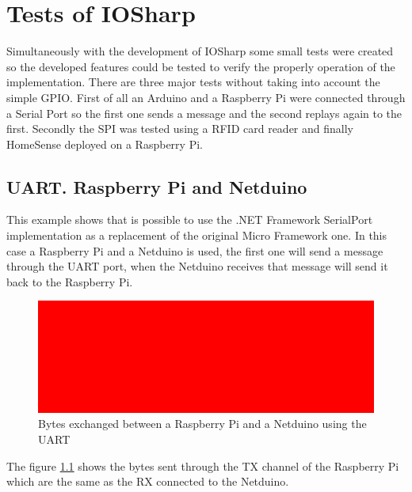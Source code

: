 \chapter{Tests of IOSharp}\label{C:IOSharp Implementation}
Simultaneously with the development of IOSharp some small tests were created so the developed features could be tested to verify the properly operation of the implementation. There are three major tests without taking into account the simple GPIO. First of all an Arduino and a Raspberry Pi were connected through a Serial Port so the first one sends a message and the second replays again to the first. Secondly the SPI was tested using a RFID card reader and finally HomeSense deployed on a Raspberry Pi.

\section{UART. Raspberry Pi and Netduino}\label{S:IOEx-UART}
This example shows that is possible to use the .NET Framework SerialPort implementation as a replacement of the original Micro Framework one. In this case a Raspberry Pi and a Netduino is used, the first one will send a message through the UART port, when the Netduino receives that message will send it back to the Raspberry Pi.
\begin{figure}[H]\begin{center}
 \centering
  \captionsetup{justification=centering}
  \includegraphics[width=1\textwidth]{pictures/sample/red}
  \caption{Bytes exchanged between a Raspberry Pi and a Netduino using the UART \label{fig:IOEx-UART}}
\end{center}\end{figure}

The figure \ref{fig:IOEx-UART} shows the bytes sent through the \gls{TX} channel of the Raspberry Pi which are the same as the \gls{RX} connected to the Netduino.

